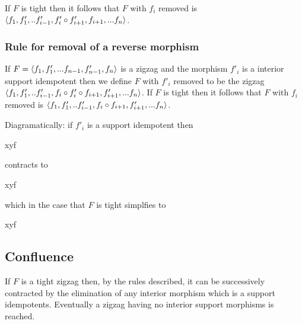 If $F$ is tight then it follows that 
$F$ with $f_i$ removed is    $\langle f_1,f'_1,..f'_{i-1},f'_i \circ f'_{i+1},f_{i+1},...f_n\rangle$.

\subsubsection{Rule for removal of a reverse morphism}

If $F=\langle f_1,f'_1,...f_{n-1},f'_{n-1},f_{n}\rangle$ is a zigzag 
and the morphism $f'_i$ is a interior support idempotent 
then we define $F$ with $f'_i$ removed to be the zigzag
$\langle f_1,f'_1,..f'_{i-1},f_i \circ f'_i \circ f_{i+1},f'_{i+1},...f_n\rangle$. 
If $F$ is tight then it follows that 
$F$ with $f_i$ removed is    $\langle f_1,f'_1,..f'_{i-1},f_i \circ f_{i+1},f'_{i+1},...f_n\rangle$.

Diagramatically: if $f'_i$ is a support idempotent  then
\begin{wrappedZigzag}{x}{y}{f}
    \arraycolsep=12pt
\end{wrappedZigzag}
contracts to
\begin{wrappedZigzag}{x}{y}{f}
    \arraycolsep=12pt
\end{wrappedZigzag}
which in the case  that $F$ is tight simplfies to
\begin{wrappedZigzag}{x}{y}{f}
    \arraycolsep=12pt
\end{wrappedZigzag}

\subsection {Confluence}

If $F$ is a tight zigzag then, by the rules described, 
it can be successively contracted by the elimination of any interior morphism which is a support idempotents. Eventually
a zigzag having no interior support morphisms is reached. 

